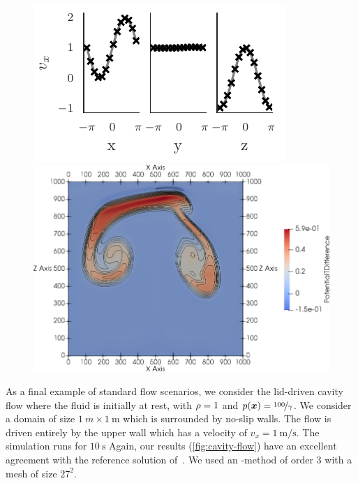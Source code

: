 \documentclass[runningheads]{llncs}
\begin{document}
\begin{figure}[tb]
\centering
\begin{minipage}{.5\textwidth}
  \centering
    \includegraphics{paper_abc_flow_velocity}
\end{minipage}%
\begin{minipage}{.5\textwidth}
  \centering
    \includegraphics[width=\textwidth]{paper_two_bubbles_fv}
\end{minipage}
\end{figure}

As a final example of standard flow scenarios, we consider the lid-driven cavity flow where the fluid is initially at rest, with $\rho = 1$ and $ p(\bm{x}) = \nicefrac{100}{\gamma}$.
We consider a domain of size $\SI{1}{m} \times \SI{1}{\m}$ which is surrounded by no-slip walls.
The flow is driven entirely by the upper wall which has a velocity of $v_x = \SI{1}{\m/\s}$.
The simulation runs for $\SI{10}{\s}$
Again, our results (\cref{fig:cavity-flow}) have an excellent agreement with the reference solution of~\cite{ghia1982high}.
We used an \aderdg{}-method of order $3$ with a mesh of size $27^2$.
\end{document}
